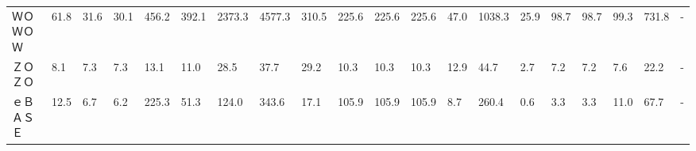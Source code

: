 \begin{longtable}[c]{lp{3mm}p{3mm}p{3mm}p{3mm}p{3mm}p{3mm}p{3mm}p{3mm}p{3mm}p{3mm}p{3mm}p{3mm}p{3mm}p{3mm}p{3mm}p{3mm}p{3mm}p{3mm}p{3mm}}
ＷＯＷＯＷ           &   61.8 &   31.6 &      30.1 &     456.2 &      392.1 &  2373.3 &  4577.3 &    310.5 &   225.6 &   225.6 &  225.6 &   47.0 &  1038.3 &    25.9 &    98.7 &   98.7 &   99.3 &   731.8 &      - \\
ＺＯＺＯ            &    8.1 &    7.3 &       7.3 &      13.1 &       11.0 &    28.5 &    37.7 &     29.2 &    10.3 &    10.3 &   10.3 &   12.9 &    44.7 &     2.7 &     7.2 &    7.2 &    7.6 &    22.2 &      - \\
ｅＢＡＳＥ           &   12.5 &    6.7 &       6.2 &     225.3 &       51.3 &   124.0 &   343.6 &     17.1 &   105.9 &   105.9 &  105.9 &    8.7 &   260.4 &     0.6 &     3.3 &    3.3 &   11.0 &    67.7 &      - \\
\end{longtable}
